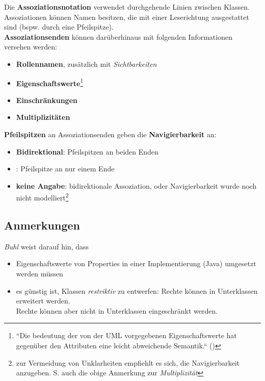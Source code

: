 \noindent
Die \textbf{Assoziationsnotation} verwendet durchgehende Linien zwischen Klassen.\\

\noindent
Assoziationen können Namen besitzen, die mit einer Leserichtung ausgestattet sind (bspw. durch eine Pfeilspitze).\\

\noindent
\textbf{Assoziationsenden} können darüberhinaus mit folgenden Informationen versehen werden:

\begin{itemize}
    \item \textbf{Rollennamen}, zusätzlich mit \textit{Sichtbarkeiten}
    \item \textbf{Eigenschaftswerte}\footnote{
    ``Die bedeutung der von der UML vorgegebenen Eigenschaftswerte hat gegenüber den Attributen eine leicht abweichende Semantik.`` (\cite[20]{Buh09})
    }
    \item \textbf{Einschränkungen}
    \item \textbf{Multiplizitäten}
\end{itemize}

\noindent
\textbf{Pfeilspitzen} an Assoziationsenden geben die \textbf{Navigierbarkeit} an:

\begin{itemize}
    \item \textbf{Bidirektional}: Pfeilspitzen an beiden Enden
    \item {}: Pfeilspitze an nur einem Ende
    \item \textbf{keine Angabe}: bidirektionale Assoziation, oder Navigierbarkeit wurde noch nicht modelliert\footnote{
     zur Vermeidung von Unklarheiten empfiehlt es sich, die Navigierbarkeit anzugeben. S. auch die obige Anmerkung zur \textit{Multiplizität}
    }
\end{itemize}

\subsection*{Anmerkungen}
\textit{Buhl} weist darauf hin, dass

\begin{itemize}
    \item Eigenschaftswerte von Properties in einer Implementierung (Java) umgesetzt werden müssen
    \item es günstig ist, Klassen \textit{restriktiv} zu entwerfen: Rechte können in Unterklassen erweitert werden.\\
    Rechte können aber nicht in Unterklassen eingeschränkt werden.
\end{itemize}

